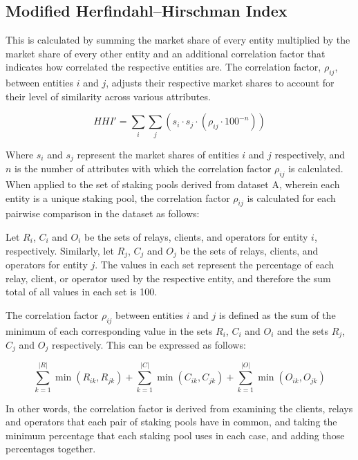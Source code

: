 \documentclass[conference]{IEEEtran}
\begin{document}

\subsection{Modified Herfindahl–Hirschman Index}
This is calculated by summing the market share of every entity multiplied by the market share of every other entity and an additional correlation factor that indicates how correlated the respective entities are.  The correlation factor, $\rho_{ij}$, between entities $i$ and $j$, adjusts their respective market shares to account for their level of similarity across various attributes.

\[
HHI' = \sum_i \sum_j \left( s_i \cdot s_j \cdot \left( \rho_{ij} \cdot 100^{-n} \right) \right)
\]

Where $s_i$ and $s_j$ represent the market shares of entities $i$ and $j$ respectively, and $n$ is the number of attributes with which the correlation factor $\rho_{ij}$ is calculated. When applied to the set of staking pools derived from dataset A, wherein each entity is a unique staking pool, the correlation factor $\rho_{ij}$ is calculated for each pairwise comparison in the dataset as follows:

Let $R_i$, $C_i$ and $O_i$ be the sets of relays, clients, and operators for entity $i$, respectively. Similarly, let $R_j$, $C_j$ and $O_j$ be the sets of relays, clients, and operators for entity $j$.  The values in each set represent the percentage of each relay, client, or operator used by the respective entity, and therefore the sum total of all values in each set is 100.

The correlation factor $\rho_{ij}$ between entities $i$ and $j$ is defined as the sum of the minimum of each corresponding value in the sets $R_i$, $C_i$ and $O_i$ and the sets $R_j$, $C_j$ and $O_j$ respectively. This can be expressed as follows:

\[
\sum_{k=1}^{|R|} \min(R_{ik}, R_{jk}) + \sum_{k=1}^{|C|} \min(C_{ik}, C_{jk}) + \sum_{k=1}^{|O|} \min(O_{ik}, O_{jk})
\]

\vspace{8pt}

In other words, the correlation factor is derived from examining the clients, relays and operators that each pair of staking pools have in common, and taking the minimum percentage that each staking pool uses in each case, and adding those percentages together.
\end{document}
